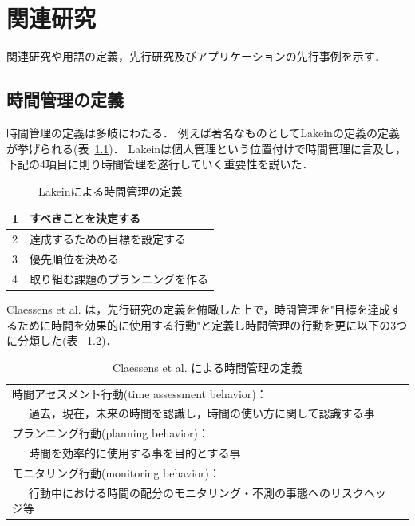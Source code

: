 \chapter{関連研究}
関連研究や用語の定義，先行研究及びアプリケーションの先行事例を示す．

\section{時間管理の定義}
時間管理の定義は多岐にわたる．
例えば著名なものとしてLakeinの定義\cite{Lakein1989}の定義が挙げられる(表~\ref{tb:Lakein})．
Lakeinは個人管理という位置付けで時間管理に言及し，下記の4項目に則り時間管理を遂行していく重要性を説いた．

\begin{table}[htb]
\begin{center}
  \begin{tabular}{|l|l|} \hline
   1 & すべきことを決定する \\ \hline
   2 & 達成するための目標を設定する \\ \hline
   3 & 優先順位を決める \\ \hline
   4 & 取り組む課題のプランニングを作る \\ \hline
  \end{tabular}
  \caption{Lakeinによる時間管理の定義}
  \label{tb:Lakein}
\end{center}
\end{table}

Claessens et al. は，先行研究の定義を俯瞰した上で，時間管理を"目標を達成するために時間を効果的に使用する行動"と定義し時間管理の行動を更に以下の3つに分類した\cite{Claessens2007}(表 ~\ref{tb:Claessens})．

\begin{table}[htb]
\begin{center}
  \begin{tabular}{|l|l|} \hline
   時間アセスメント行動(time assessment behavior)： \\ ~~~過去，現在，未来の時間を認識し，時間の使い方に関して認識する事 \\ \hline
   プランニング行動(planning behavior)：　\\  ~~~時間を効率的に使用する事を目的とする事 \\ \hline
   モニタリング行動(monitoring behavior)： \\ ~~~行動中における時間の配分のモニタリング・不測の事態へのリスクヘッジ等 \\ \hline
  \end{tabular}
  \caption{Claessens et al. による時間管理の定義}
  \label{tb:Claessens}
\end{center}
\end{table}

